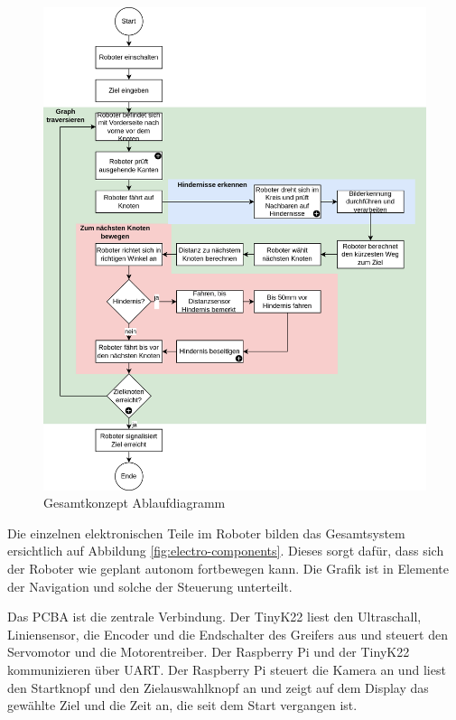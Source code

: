 \begin{figure}[H]
\centering
\includegraphics[width=\textwidth]{assets/gesamtkonzept/ablaufdiagramm.png}
\caption{Gesamtkonzept Ablaufdiagramm}
\label{fig:ablauf}
\end{figure}

\newpage
Die einzelnen elektronischen Teile im Roboter bilden das Gesamtsystem ersichtlich auf Abbildung \ref{fig:electro-components}. Dieses sorgt dafür, dass sich der Roboter wie geplant autonom fortbewegen kann.  Die Grafik ist in Elemente der Navigation und solche der Steuerung unterteilt.

Das PCBA ist die zentrale Verbindung. Der TinyK22 liest den Ultraschall, Liniensensor, die Encoder und die Endschalter des Greifers aus und steuert den Servomotor und die Motorentreiber. Der Raspberry Pi und der TinyK22 kommunizieren über UART. Der Raspberry Pi steuert die Kamera an und liest den Startknopf und den Zielauswahlknopf an und zeigt auf dem Display das gewählte Ziel und die Zeit an, die seit dem Start vergangen ist.


